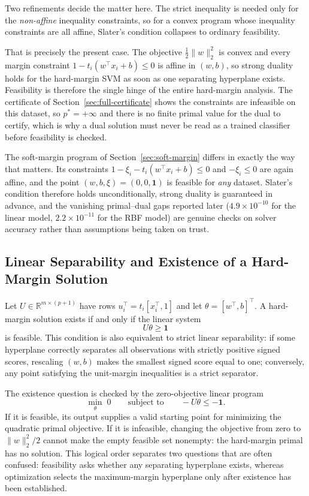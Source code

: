 \documentclass[11pt,a4paper]{article}
\numberwithin{equation}{section} %
\begin{document}
Two refinements decide the matter here. The strict inequality is needed only
for the \emph{non-affine} inequality constraints, so for a convex program
whose inequality constraints are all affine, Slater's condition collapses to
ordinary feasibility.

That is precisely the present case. The objective
$\frac12\lVert w\rVert_2^2$ is convex and every margin constraint
$1-t_i(w^\top x_i+b)\leq0$ is affine in $(w,b)$, so strong duality holds for
the hard-margin SVM as soon as one separating hyperplane exists. Feasibility is therefore the single hinge of the entire hard-margin
analysis. The certificate of Section~\ref{sec:full-certificate} shows the
constraints are infeasible on this dataset, so $p^*=+\infty$ and there is no
finite primal value for the dual to certify, which is why a dual solution
must never be read as a trained classifier before feasibility is checked.

The soft-margin program of Section~\ref{sec:soft-margin} differs in exactly
the way that matters. Its constraints
$1-\xi_i-t_i(w^\top x_i+b)\leq0$ and $-\xi_i\leq0$ are again affine, and the
point $(w,b,\xi)=(0,0,\mathbf{1})$ is feasible for \emph{any} dataset.
Slater's condition therefore holds unconditionally, strong duality is
guaranteed in advance, and the vanishing primal--dual gaps reported later
($4.9\times10^{-10}$ for the linear model, $2.2\times10^{-11}$ for the RBF
model) are genuine checks on solver accuracy rather than assumptions being
taken on trust.

\subsection{Linear Separability and Existence of a Hard-Margin Solution}

Let $U\in\mathbb{R}^{m\times(p+1)}$ have rows
$u_i^\top=t_i[x_i^\top,1]$ and let
$\theta=[w^\top,b]^\top$. A hard-margin solution exists if and only if the
linear system
\begin{equation}
    U\theta\geq\mathbf{1}
\end{equation}
is feasible. This condition is also equivalent to strict linear separability:
if some hyperplane correctly separates all observations with strictly positive
signed scores, rescaling $(w,b)$ makes the smallest signed score equal to one;
conversely, any point satisfying the unit-margin inequalities is a strict
separator.

The existence question is checked by the zero-objective linear program
\begin{equation}
    \min_{\theta}\;0
    \qquad\text{subject to}\qquad
    -U\theta\leq-\mathbf{1}.
\end{equation}
If it is feasible, its output supplies a valid starting point for minimizing
the quadratic primal objective. If it is infeasible, changing the objective
from zero to $\lVert w\rVert_2^2/2$ cannot make the empty feasible set nonempty:
the hard-margin primal has no solution. This logical order separates two
questions that are often confused: feasibility asks whether any separating
hyperplane exists, whereas optimization selects the maximum-margin hyperplane
only after existence has been established.
\end{document}
